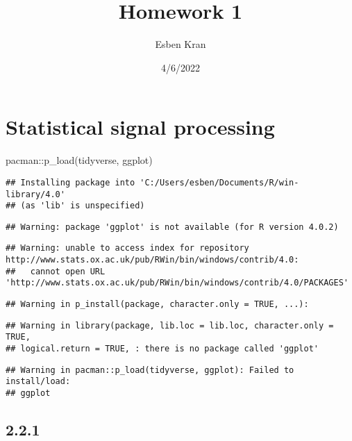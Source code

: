 \documentclass[
]{article}
\title{Homework 1}
\author{Esben Kran}
\date{4/6/2022}
\newenvironment{Shaded}{\begin{snugshade}}{\end{snugshade}}
\newcommand{\FunctionTok}[1]{\textcolor[rgb]{0.00,0.00,0.00}{#1}}
\newcommand{\NormalTok}[1]{#1}
\newcommand{\SpecialCharTok}[1]{\textcolor[rgb]{0.00,0.00,0.00}{#1}}
\begin{document}
\maketitle

\hypertarget{statistical-signal-processing}{%
\section{Statistical signal
processing}\label{statistical-signal-processing}}

\begin{Shaded}
\begin{Highlighting}[]
\NormalTok{pacman}\SpecialCharTok{::}\FunctionTok{p\_load}\NormalTok{(tidyverse, ggplot)}
\end{Highlighting}
\end{Shaded}

\begin{verbatim}
## Installing package into 'C:/Users/esben/Documents/R/win-library/4.0'
## (as 'lib' is unspecified)
\end{verbatim}

\begin{verbatim}
## Warning: package 'ggplot' is not available (for R version 4.0.2)
\end{verbatim}

\begin{verbatim}
## Warning: unable to access index for repository http://www.stats.ox.ac.uk/pub/RWin/bin/windows/contrib/4.0:
##   cannot open URL 'http://www.stats.ox.ac.uk/pub/RWin/bin/windows/contrib/4.0/PACKAGES'
\end{verbatim}

\begin{verbatim}
## Warning in p_install(package, character.only = TRUE, ...):
\end{verbatim}

\begin{verbatim}
## Warning in library(package, lib.loc = lib.loc, character.only = TRUE,
## logical.return = TRUE, : there is no package called 'ggplot'
\end{verbatim}

\begin{verbatim}
## Warning in pacman::p_load(tidyverse, ggplot): Failed to install/load:
## ggplot
\end{verbatim}

\hypertarget{section}{%
\subsection{2.2.1}\label{section}}
\end{document}
